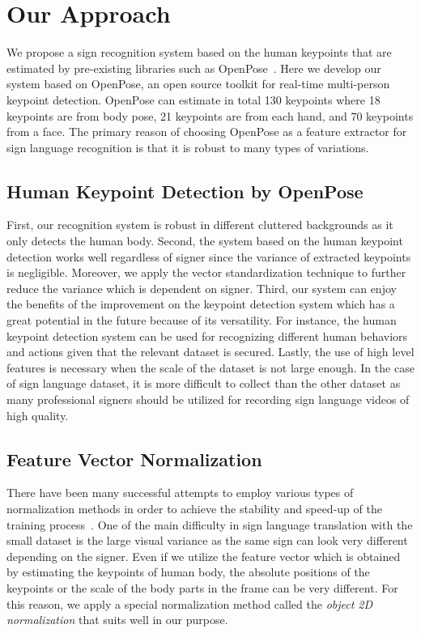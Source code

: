 \documentclass[10pt,twocolumn,letterpaper]{article}
\begin{document}
\section{Our Approach}
We propose a sign recognition system based on the human keypoints that are estimated by pre-existing libraries such as OpenPose~\cite{CaoSWS17,SimonJMS17,WeiRKS16}. Here we develop our system based on OpenPose, an open source toolkit for real-time multi-person keypoint detection. OpenPose can estimate in total 130 keypoints where 18 keypoints are from body pose, 21 keypoints are from each hand, and 70 keypoints from a face. The primary reason of choosing OpenPose as a feature extractor for sign language recognition is that it is robust to many types of variations.

\subsection{Human Keypoint Detection by OpenPose}

First, our recognition system is robust in different cluttered backgrounds as it only detects the human body. Second, the system based on the human keypoint detection works well regardless of signer since the variance of extracted keypoints is negligible. Moreover, we apply the vector standardization technique to further reduce the variance which is dependent on signer. Third, our system can enjoy the benefits of the improvement on the keypoint detection system which has a great potential in the future because of its versatility. For instance, the human keypoint detection system can be used for recognizing different human behaviors and actions given that the relevant dataset is secured. Lastly, the use of high level features is necessary when the scale of the dataset is not large enough. In the case of sign language dataset, it is more difficult to collect than the other dataset as many professional signers should be utilized for recording sign language videos of high quality.

\subsection{Feature Vector Normalization}
There have been many successful attempts to employ various types of normalization methods in order to achieve the stability and speed-up of the training process~\cite{BaKH16,IoffeS15,UlyanovVL16}. One of the main difficulty in sign language translation with the small dataset is the large visual variance as the same sign can look very different depending on the signer. Even if we utilize the feature vector which is obtained by estimating the keypoints of human body, the absolute positions of the keypoints or the scale of the body parts in the frame can be very different.
For this reason, we apply a special normalization method called the {\em object 2D normalization} that suits well in our purpose.
\end{document}
